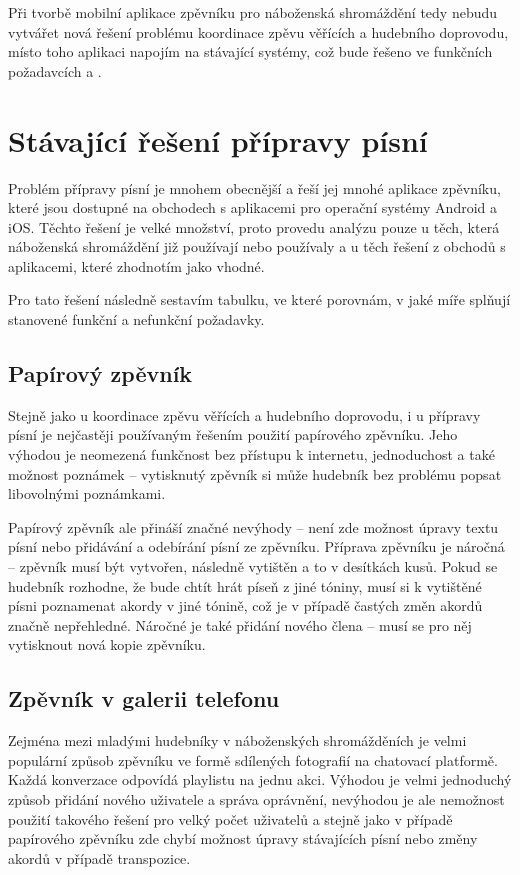 Při tvorbě mobilní aplikace zpěvníku pro náboženská shromáždění tedy nebudu vytvářet nová řešení problému koordinace zpěvu věřících a hudebního doprovodu, místo toho aplikaci napojím na stávající systémy, což bude řešeno ve funkčních požadavcích  a .

\section{Stávající řešení přípravy písní}

Problém přípravy písní je mnohem obecnější a řeší jej mnohé aplikace zpěvníku, které jsou dostupné na obchodech s aplikacemi pro operační systémy Android a iOS. Těchto řešení je velké množství, proto provedu analýzu pouze u těch, která náboženská shromáždění již používají nebo používaly a u těch řešení z obchodů s aplikacemi, které zhodnotím jako vhodné.

Pro tato řešení následně sestavím tabulku, ve které porovnám, v jaké míře splňují stanovené funkční a nefunkční požadavky.

\subsection{Papírový zpěvník}

Stejně jako u koordinace zpěvu věřících a hudebního doprovodu, i u přípravy písní je nejčastěji používaným řešením použití papírového zpěvníku. Jeho výhodou je neomezená funkčnost bez přístupu k internetu, jednoduchost a také možnost poznámek -- vytisknutý zpěvník si může hudebník bez problému popsat libovolnými poznámkami.

Papírový zpěvník ale přináší značné nevýhody -- není zde možnost úpravy textu písní nebo přidávání a odebírání písní ze zpěvníku. Příprava zpěvníku je náročná -- zpěvník musí být vytvořen, následně vytištěn a to v desítkách kusů. Pokud se hudebník rozhodne, že bude chtít hrát píseň z jiné tóniny, musí si k vytištěné písni poznamenat akordy v jiné tónině, což je v případě častých změn akordů značně nepřehledné. Náročné je také přidání nového člena -- musí se pro něj vytisknout nová kopie zpěvníku.

\subsection{Zpěvník v galerii telefonu}

Zejména mezi mladými hudebníky v náboženských shromážděních je velmi populární způsob zpěvníku ve formě sdílených fotografií na chatovací platformě. Každá konverzace odpovídá playlistu na jednu akci. Výhodou je velmi jednoduchý způsob přidání nového uživatele a správa oprávnění, nevýhodou je ale nemožnost použití takového řešení pro velký počet uživatelů a stejně jako v případě papírového zpěvníku zde chybí možnost úpravy stávajících písní nebo změny akordů v případě transpozice.

